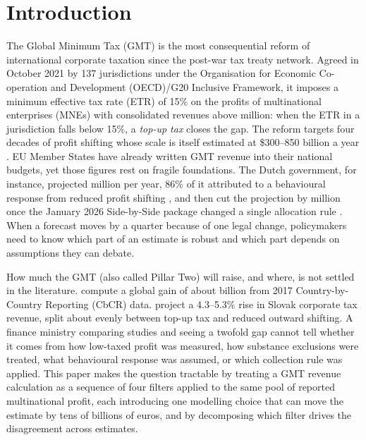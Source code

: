 \documentclass[11pt,a4paper]{article}
\newcommand{\EUR}{\texteuro}
\begin{document}
\newpage
{}
\setcounter{page}{1}

\section{Introduction}\label{sec:introduction}

The Global Minimum Tax (GMT) is the most consequential reform of international corporate taxation since the post-war tax treaty network. Agreed in October 2021 by 137 jurisdictions under the Organisation for Economic Co-operation and Development (OECD)/G20 Inclusive Framework, it imposes a minimum effective tax rate (ETR) of 15\% on the profits of multinational enterprises (MNEs) with consolidated revenues above \EUR750 million: when the ETR in a jurisdiction falls below 15\%, a \emph{top-up tax} closes the gap. The reform targets four decades of profit shifting whose scale is itself estimated at \$300--850 billion a year \citep{torslov2023,garcia-bernardo2024,blouin2023,cobham2018}. EU Member States have already written GMT revenue into their national budgets, yet those figures rest on fragile foundations. The Dutch government, for instance, projected \EUR466 million per year, 86\% of it attributed to a behavioural response from reduced profit shifting \citep{36369_3}, and then cut the projection by \EUR122 million once the January 2026 Side-by-Side package changed a single allocation rule \citep{1028}. When a forecast moves by a quarter because of one legal change, policymakers need to know which part of an estimate is robust and which part depends on assumptions they can debate.

How much the GMT (also called Pillar Two) will raise, and where, is not settled in the literature. \citet{barake2022} compute a global gain of about \EUR179 billion from 2017 Country-by-Country Reporting (CbCR) data. \citet{boukal2026} project a 4.3--5.3\% rise in Slovak corporate tax revenue, split about evenly between top-up tax and reduced outward shifting. A finance ministry comparing studies and seeing a twofold gap cannot tell whether it comes from how low-taxed profit was measured, how substance exclusions were treated, what behavioural response was assumed, or which collection rule was applied. This paper makes the question tractable by treating a GMT revenue calculation as a sequence of four filters applied to the same pool of reported multinational profit, each introducing one modelling choice that can move the estimate by tens of billions of euros, and by decomposing which filter drives the disagreement across estimates.
\end{document}
